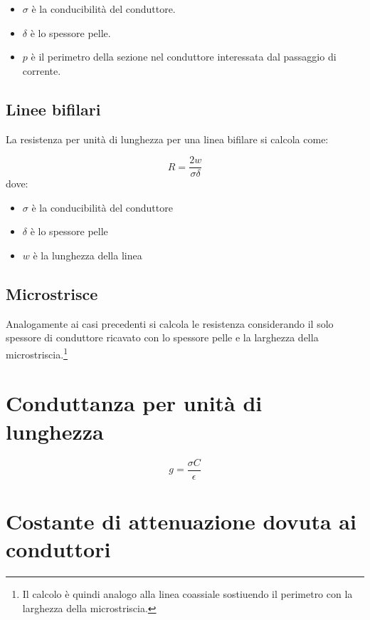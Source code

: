 			\begin{itemize}
			\item $\sigma$ è la conducibilità del conduttore.
			\item $\delta$ è lo spessore pelle.
			\item $p$ è il perimetro della sezione nel conduttore interessata dal passaggio di corrente.
			\end{itemize}

		\subsection{Linee bifilari}

				La resistenza per unità di lunghezza per una linea bifilare si calcola come:

				\begin{equation}R=\frac{2w}{\sigma \delta}\end{equation}
				dove:
				
				\begin{itemize}
				\item $\sigma$ è la conducibilità del conduttore
				\item $\delta$ è lo spessore pelle
				\item $w$ è la lunghezza della linea
				\end{itemize}

		\subsection{Microstrisce}

			Analogamente ai casi precedenti si calcola le resistenza considerando il solo spessore di conduttore ricavato con lo spessore pelle e la larghezza della microstriscia.\footnote{Il calcolo è quindi analogo alla linea coassiale sostiuendo il perimetro con la larghezza della microstriscia.}

	\section{Conduttanza per unità di lunghezza}

			\begin{equation}
			g=\frac{\sigma C}{\epsilon}
			\end{equation}





	\section{Costante di attenuazione dovuta ai conduttori}
	
